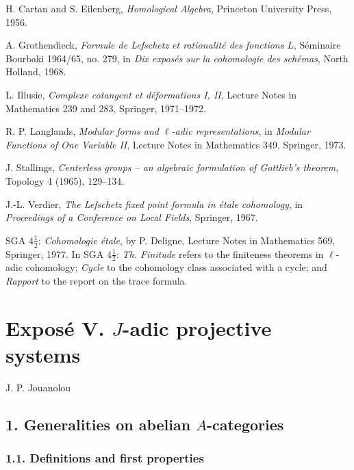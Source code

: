 \documentclass[12pt]{article}
\begin{document}
\begin{enumerate}[label={[\arabic*]}]
\item H. Cartan and S. Eilenberg, \emph{Homological Algebra}, Princeton University Press, 1956.
\item A. Grothendieck, \emph{Formule de Lefschetz et rationalité des fonctions $L$}, Séminaire Bourbaki 1964/65, no. 279, in \emph{Dix exposés sur la cohomologie des schémas}, North Holland, 1968.
\item L. Illusie, \emph{Complexe cotangent et déformations I, II}, Lecture Notes in Mathematics 239 and 283, Springer, 1971--1972.
\item R. P. Langlands, \emph{Modular forms and $\ell$-adic representations}, in \emph{Modular Functions of One Variable II}, Lecture Notes in Mathematics 349, Springer, 1973.
\item J. Stallings, \emph{Centerless groups -- an algebraic formulation of Gottlieb's theorem}, Topology 4 (1965), 129--134.
\item J.-L. Verdier, \emph{The Lefschetz fixed point formula in étale cohomology}, in \emph{Proceedings of a Conference on Local Fields}, Springer, 1967.
\end{enumerate}

SGA $4\frac12$: \emph{Cohomologie étale}, by P. Deligne, Lecture Notes in Mathematics
569, Springer, 1977. In SGA $4\frac12$: \emph{Th. Finitude} refers to the finiteness
theorems in $\ell$-adic cohomology; \emph{Cycle} to the cohomology class associated
with a cycle; and \emph{Rapport} to the report on the trace formula.

\newpage

\section*{Exposé V. $J$-adic projective systems}
\begin{center}
\large J. P. Jouanolou
\end{center}

\subsection*{1. Generalities on abelian $A$-categories}

\subsubsection*{1.1. Definitions and first properties}
\end{document}
